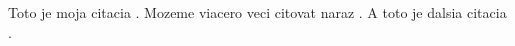 \documentclass{book}
\begin{document}
Toto je moja citacia \cite{Eykhoff84}. Mozeme viacero veci citovat naraz \cite{Eykhoff84,Far90}. A toto je dalsia citacia \cite{Fontes}.



\end{document}

